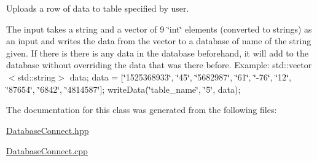 Uploads a row of data to table specified by user. 

The input takes a string and a vector of 9 \char`\"{}int\char`\"{} elements (converted to strings) as an input and writes the data from the vector to a database of name of the string given. If there is there is any data in the database beforehand, it will add to the database without overriding the data that was there before. Example\+: std\+::vector$<$std\+::string$>$ data; data = \mbox{[}\char`\"{}1525368933\char`\"{}, \char`\"{}45\char`\"{}, \char`\"{}5682987\char`\"{}, \char`\"{}61\char`\"{}, \char`\"{}-\/76\char`\"{}, \char`\"{}12\char`\"{}, \char`\"{}87654\char`\"{}, \char`\"{}6842\char`\"{}, \char`\"{}4814587\char`\"{}\mbox{]}; write\+Data(\char`\"{}table\+\_\+name\char`\"{}, \char`\"{}5\char`\"{}, data); 

The documentation for this class was generated from the following files\+:\begin{DoxyCompactItemize}
\item 
\mbox{\hyperlink{DatabaseConnect_8hpp}{Database\+Connect.\+hpp}}\item 
\mbox{\hyperlink{DatabaseConnect_8cpp}{Database\+Connect.\+cpp}}\end{DoxyCompactItemize}
